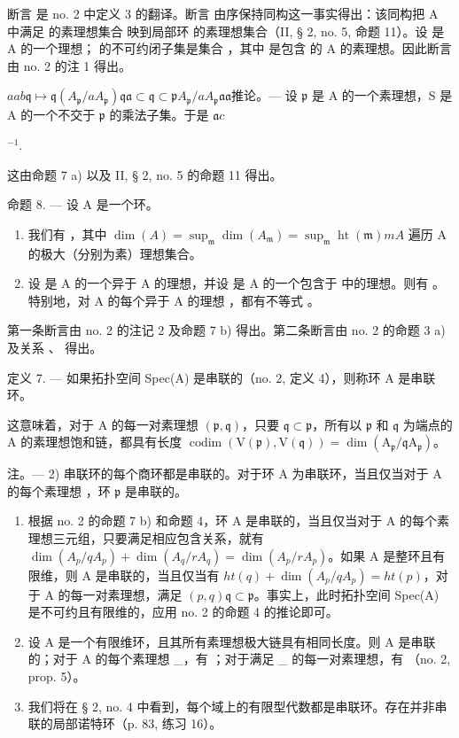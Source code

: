 断言  是 no. 2 中定义 3  的翻译。断言  由序保持同构这一事实得出：该同构把 A 中满足  的素理想集合  映到局部环  的素理想集合（II, § 2, no. 5, 命题 11）。设  是 A 的一个理想；  的不可约闭子集是集合 ，其中  是包含  的 A 的素理想。因此断言  由 no. 2 的注 1 得出。

\(a\)\(a\)\(b\)\(\mathfrak{q} \mapsto \mathfrak{q}(A_{\mathfrak{p}} / aA_{\mathfrak{p}})\)\(\mathfrak{q}\)\(\mathfrak{a} \subset \mathfrak{q} \subset \mathfrak{p}\)\(A_{\mathfrak{p}} / aA_{\mathfrak{p}}\)\(\mathfrak{a}\)\(\mathfrak{a}\)推论。--- 设 \(\mathfrak{p}\) 是 A 的一个素理想，S 是 A 的一个不交于 \(\mathfrak{p}\) 的乘法子集。于是 \(\mathfrak{a}\)\(c\)

\(^{-1}\).

这由命题 7 a) 以及 II, § 2, no. 5 的命题 11 得出。

命题 8. --- 设 A 是一个环。

\begin{enumerate}
\def\labelenumi{\alph{enumi})}
\item
我们有  ，其中 \(\dim(A) = \sup_{\mathfrak{m}} \dim(A_{\mathfrak{m}}) = \sup_{\mathfrak{m}} \operatorname{ht}(\mathfrak{m})\)\(m\)\(A\) 遍历 A 的极大（分别为素）理想集合。
\item
设  是 A 的一个异于 A 的理想，并设  是 A 的一个包含于  中的理想。则有  。特别地，对 A 的每个异于 A 的理想  ，都有不等式 。
\end{enumerate}

第一条断言由 no. 2 的注记 2 及命题 7 b) 得出。第二条断言由 no. 2 的命题 3 a) 及关系  、  得出。

定义 7. --- 如果拓扑空间 Spec(A) 是串联的（no. 2, 定义 4），则称环 A 是串联环。

这意味着，对于 A 的每一对素理想 \((\mathfrak{p}, \mathfrak{q})\)，只要 \(\mathfrak{q} \subset \mathfrak{p}\)，所有以 \(\mathfrak{p}\) 和 \(\mathfrak{q}\) 为端点的 A 的素理想饱和链，都具有长度 \(\operatorname{codim}(\mathrm{V}(\mathfrak{p}), \mathrm{V}(\mathfrak{q})) = \dim(\mathrm{A}_{\mathfrak{p}} / \mathfrak{q}\mathrm{A}_{\mathfrak{p}})\)。

注。--- 2) 串联环的每个商环都是串联的。对于环 A 为串联环，当且仅当对于 A 的每个素理想  ，环 \(\mathfrak{p}\) 是串联的。

\begin{enumerate}
\def\labelenumi{\arabic{enumi})}
\setcounter{enumi}{2}
\item
  根据 no. 2 的命题 7 b) 和命题 4，环 A 是串联的，当且仅当对于 A 的每个素理想三元组，只要满足相应包含关系，就有 \(\dim(A_{p}/qA_{p}) + \dim(A_{q}/rA_{q}) = \dim(A_{p}/rA_{p})\)。如果 A 是整环且有限维，则 A 是串联的，当且仅当有 \(ht(q) + \dim(A_{p}/qA_{p}) = ht(p)\)，对于 A 的每一对素理想，满足 \((p, q)\)\(\mathfrak{q} \subset \mathfrak{p}\)。事实上，此时拓扑空间 Spec(A) 是不可约且有限维的，应用 no. 2 的命题 4 的推论即可。
\item
  设 A 是一个有限维环，且其所有素理想极大链具有相同长度。则 A 是串联的；对于 A 的每个素理想 \_，有 ；对于满足 \_ 的每一对素理想，有  （no. 2, prop. 5）。
\item
我们将在 § 2, no. 4 中看到，每个域上的有限型代数都是串联环。存在并非串联的局部诺特环（p. 83, 练习 16）。
\end{enumerate}

